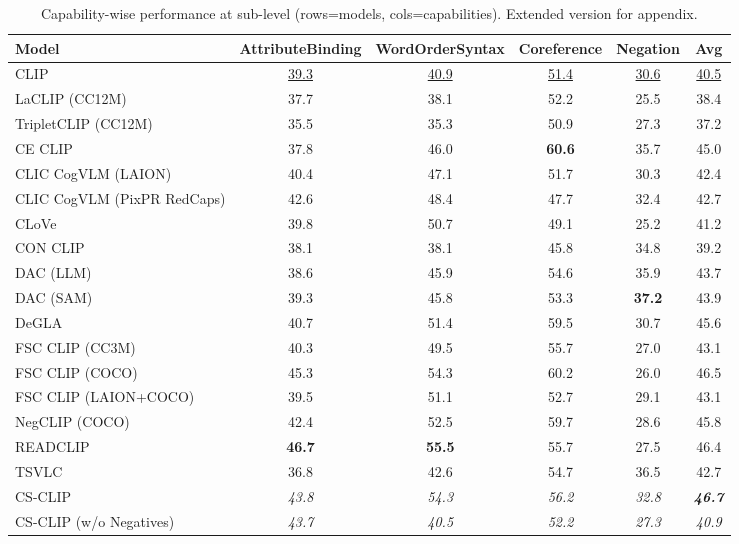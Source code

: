 \begin{table}[t]
  \centering
  \scriptsize
  \caption{Capability-wise performance at sub-level (rows=models, cols=capabilities). Extended version for appendix.}
  \label{tab:caps_sub_part2}
  \begin{adjustbox}{max width=\textwidth}
  \setlength{\tabcolsep}{2pt}
  \begin{tabular}{p{5.0cm}ccccc}
    \toprule
    Model & AttributeBinding & WordOrderSyntax & Coreference & Negation & Avg \\
    \midrule
    CLIP & \underline{39.3} & \underline{40.9} & \underline{51.4} & \underline{30.6} & \underline{40.5} \\
    \midrule
    LaCLIP (CC12M) & 37.7 & 38.1 & 52.2 & 25.5 & 38.4 \\
    TripletCLIP (CC12M) & 35.5 & 35.3 & 50.9 & 27.3 & 37.2 \\
    \midrule
    CE CLIP & 37.8 & 46.0 & \textbf{60.6} & 35.7 & 45.0 \\
    CLIC CogVLM (LAION) & 40.4 & 47.1 & 51.7 & 30.3 & 42.4 \\
    CLIC CogVLM (PixPR RedCaps) & 42.6 & 48.4 & 47.7 & 32.4 & 42.7 \\
    CLoVe & 39.8 & 50.7 & 49.1 & 25.2 & 41.2 \\
    CON CLIP & 38.1 & 38.1 & 45.8 & 34.8 & 39.2 \\
    DAC (LLM) & 38.6 & 45.9 & 54.6 & 35.9 & 43.7 \\
    DAC (SAM) & 39.3 & 45.8 & 53.3 & \textbf{37.2} & 43.9 \\
    DeGLA & 40.7 & 51.4 & 59.5 & 30.7 & 45.6 \\
    FSC CLIP (CC3M) & 40.3 & 49.5 & 55.7 & 27.0 & 43.1 \\
    FSC CLIP (COCO) & 45.3 & 54.3 & 60.2 & 26.0 & 46.5 \\
    FSC CLIP (LAION+COCO) & 39.5 & 51.1 & 52.7 & 29.1 & 43.1 \\
    NegCLIP (COCO) & 42.4 & 52.5 & 59.7 & 28.6 & 45.8 \\
    READCLIP & \textbf{46.7} & \textbf{55.5} & 55.7 & 27.5 & 46.4 \\
    TSVLC & 36.8 & 42.6 & 54.7 & 36.5 & 42.7 \\
    \midrule
    CS-CLIP & \emph{43.8} & \emph{54.3} & \emph{56.2} & \emph{32.8} & \textbf{\emph{46.7}} \\
    CS-CLIP (w/o Negatives) & \emph{43.7} & \emph{40.5} & \emph{52.2} & \emph{27.3} & \emph{40.9} \\
    \bottomrule
  \end{tabular}
  \end{adjustbox}
\end{table}

